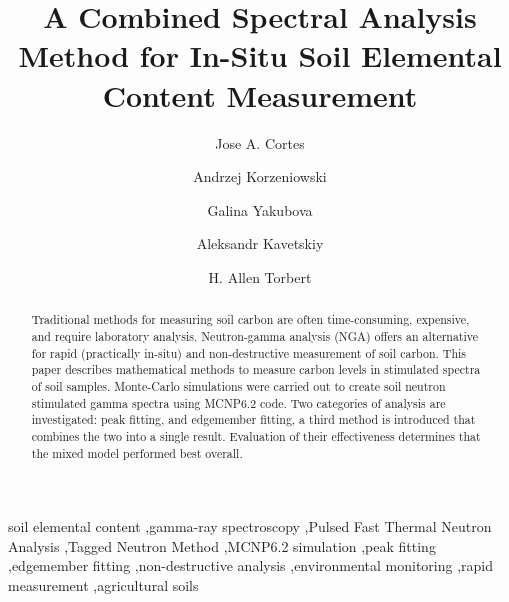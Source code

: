 \documentclass[preprint, 12pt]{elsarticle}
\begin{document}
\begin{frontmatter}

\title{
    A Combined Spectral Analysis Method for In-Situ Soil Elemental Content Measurement
    }

\author[uta]{Jose A. Cortes}

\author[uta]{Andrzej Korzeniowski}

\author[usda]{Galina Yakubova}

\author[usda]{Aleksandr Kavetskiy}

\author[usda]{H. Allen Torbert}





\begin{abstract}

Traditional methods for measuring soil carbon are often time-consuming, expensive, and require laboratory analysis. Neutron-gamma analysis (NGA) offers an alternative for rapid (practically in-situ) and non-destructive measurement of soil carbon. This paper describes mathematical methods to measure carbon levels in stimulated spectra of soil samples. Monte-Carlo simulations were carried out to create soil neutron stimulated gamma spectra using MCNP6.2 code. Two categories of analysis are investigated: peak fitting, and edgemember fitting, a third method is introduced that combines the two into a single result. Evaluation of their effectiveness determines that the mixed model performed best overall.

\end{abstract}
\begin{keyword}
soil elemental content \sep gamma-ray spectroscopy 
\sep Pulsed Fast Thermal Neutron Analysis \sep Tagged Neutron Method 
\sep MCNP6.2 simulation \sep peak fitting 
\sep edgemember fitting \sep non-destructive analysis 
\sep environmental monitoring \sep rapid measurement 
\sep agricultural soils
\end{keyword}

\end{frontmatter}
\end{document}

